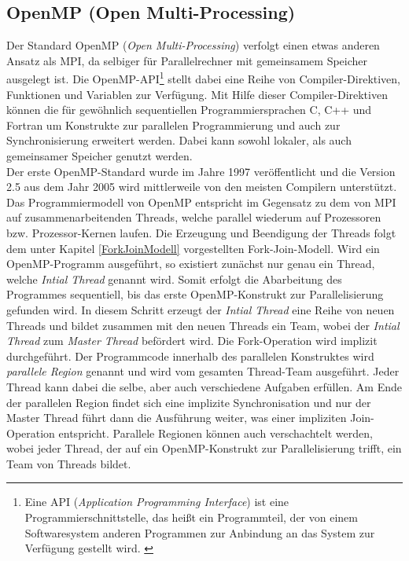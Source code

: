 		\subsection{OpenMP (Open Multi-Processing)}
			\label{OpenMP}
			
			Der Standard OpenMP (\textit{Open Multi-Processing}) verfolgt einen etwas anderen Ansatz als MPI, da selbiger für Parallelrechner mit gemeinsamem Speicher ausgelegt ist. Die OpenMP-API\footnote{Eine API (\textit{Application Programming Interface}) ist eine Programmierschnittstelle, das heißt ein Programmteil, der von einem Softwaresystem anderen Programmen zur Anbindung an das System zur Verfügung gestellt wird. \cite{APIWikipedia}} stellt dabei eine Reihe von Compiler-Direktiven, Funktionen und Variablen zur Verfügung. Mit Hilfe dieser Compiler-Direktiven können die für gewöhnlich sequentiellen Programmiersprachen C, C++ und Fortran um Konstrukte zur parallelen Programmierung und auch zur Synchronisierung erweitert werden. Dabei kann sowohl lokaler, als auch gemeinsamer Speicher genutzt werden.\\
			Der erste OpenMP-Standard wurde im Jahre 1997 veröffentlicht und die Version 2.5 aus dem Jahr 2005 wird mittlerweile von den meisten Compilern unterstützt.\\
			Das Programmiermodell von OpenMP entspricht im Gegensatz zu dem von MPI auf zusammenarbeitenden Threads, welche parallel wiederum auf Prozessoren bzw. Prozessor-Kernen laufen. Die Erzeugung und Beendigung der Threads folgt dem unter Kapitel \ref{ForkJoinModell} vorgestellten Fork-Join-Modell. Wird ein OpenMP-Programm ausgeführt, so existiert zunächst nur genau ein Thread, welche \textit{Intial Thread} genannt wird. Somit erfolgt die Abarbeitung des Programmes sequentiell, bis das erste OpenMP-Konstrukt zur Parallelisierung gefunden wird. In diesem Schritt erzeugt der \textit{Intial Thread} eine Reihe von neuen Threads und bildet zusammen mit den neuen Threads ein Team, wobei der \textit{Intial Thread} zum \textit{Master Thread} befördert wird. Die Fork-Operation wird implizit durchgeführt. Der Programmcode innerhalb des parallelen Konstruktes wird \textit{parallele Region} genannt und wird vom gesamten Thread-Team ausgeführt. Jeder Thread kann dabei die selbe, aber auch verschiedene Aufgaben erfüllen. Am Ende der parallelen Region findet sich eine implizite Synchronisation und nur der Master Thread führt dann die Ausführung weiter, was einer impliziten Join-Operation entspricht. Parallele Regionen können auch verschachtelt werden, wobei jeder Thread, der auf ein OpenMP-Konstrukt zur Parallelisierung trifft, ein Team von Threads bildet.\\
